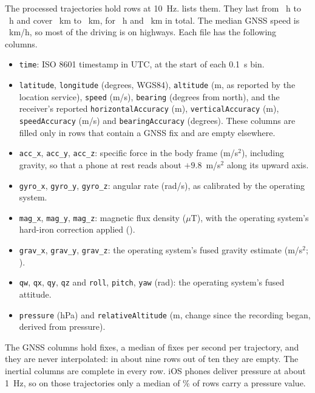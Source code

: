 The \numTrajectories{} processed trajectories hold \numRows{} rows at 10~Hz.  lists them. They last from \numMinHours~h to \numMaxHours~h and cover \numMinKm~km to \numMaxKm~km, for \numTotalHours~h and \numTotalKm~km in total. The median GNSS speed is \numMedianSpeed~km/h, so most of the driving is on highways. Each file has the following columns.
\begin{itemize}
\item \texttt{time}: ISO 8601 timestamp in UTC, at the start of each 0.1~s bin.
\item \texttt{latitude}, \texttt{longitude} (degrees, WGS84), \texttt{altitude} (m, as reported by the location service), \texttt{speed} (m/s), \texttt{bearing} (degrees from north), and the receiver's reported \texttt{horizontalAccuracy} (m), \texttt{verticalAccuracy} (m), \texttt{speedAccuracy} (m/s) and \texttt{bearingAccuracy} (degrees). These columns are filled only in rows that contain a GNSS fix and are empty elsewhere.
\item \texttt{acc\_x}, \texttt{acc\_y}, \texttt{acc\_z}: specific force in the body frame (m/s\(^2\)), including gravity, so that a phone at rest reads about \(+9.8\)~m/s\(^2\) along its upward axis.
\item \texttt{gyro\_x}, \texttt{gyro\_y}, \texttt{gyro\_z}: angular rate (rad/s), as calibrated by the operating system.
\item \texttt{mag\_x}, \texttt{mag\_y}, \texttt{mag\_z}: magnetic flux density (\(\mu\)T), with the operating system's hard-iron correction applied ().
\item \texttt{grav\_x}, \texttt{grav\_y}, \texttt{grav\_z}: the operating system's fused gravity estimate (m/s\(^2\); ).
\item \texttt{qw}, \texttt{qx}, \texttt{qy}, \texttt{qz} and \texttt{roll}, \texttt{pitch}, \texttt{yaw} (rad): the operating system's fused attitude.
\item \texttt{pressure} (hPa) and \texttt{relativeAltitude} (m, change since the recording began, derived from pressure).
\end{itemize}
The GNSS columns hold \numFixes{} fixes, a median of \numMedianFixRate{} fixes per second per trajectory, and they are never interpolated: in about nine rows out of ten they are empty. The inertial columns are complete in every row. iOS phones deliver pressure at about 1~Hz, so on those trajectories only a median of \numIosBaroFraction\% of rows carry a pressure value.

